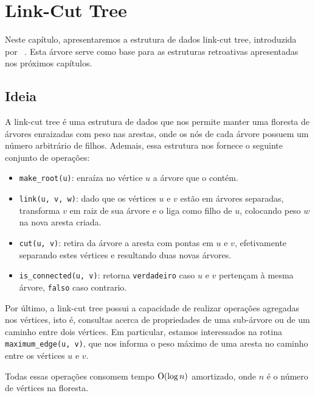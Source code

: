 
\chapter{Link-Cut Tree}
\label{cap:link-cut-trees}

Neste capítulo, apresentaremos a estrutura de dados link-cut tree, introduzida por ~\citet{10.1145/800076.802464}. Esta árvore serve como base para as estruturas retroativas apresentadas nos próximos capítulos.

\section{Ideia}
\label{sec:lct-ideia}

A link-cut tree é uma estrutura de dados que nos permite manter uma floresta de árvores enraizadas com peso nas arestas, onde os nós de cada árvore possuem um número arbitrário de filhos. Ademais, essa estrutura nos fornece o seguinte conjunto de operações:

\begin{itemize}
    \item \texttt{make\_root(u)}: enraíza no vértice $u$ a árvore que o contém.
    \item \texttt{link(u, v, w)}: dado que os vértices $u$ e $v$ estão em árvores separadas, transforma $v$ em raiz de sua árvore e o liga como filho de $u$, colocando peso $w$ na nova aresta criada.
    \item \texttt{cut(u, v)}: retira da árvore a aresta com pontas em $u$ e $v$, efetivamente separando estes vértices e resultando duas novas árvores.
    \item \texttt{is\_connected(u, v)}: retorna \texttt{verdadeiro} caso $u$ e $v$ pertençam à mesma árvore, \texttt{falso} caso contrario.
\end{itemize}

Por último, a link-cut tree possui a capacidade de realizar operações agregadas nos vértices, isto é, consultas acerca de propriedades de uma sub-árvore ou de um caminho entre dois vértices. Em particular, estamos interessados na rotina \texttt{maximum\_edge(u, v)}, que nos informa o peso máximo de uma aresta no caminho entre os vértices $u$ e $v$.

Todas essas operações consomem tempo $\mathrm{O}(\log n)$ amortizado, onde $n$ é o número de vértices na floresta.

